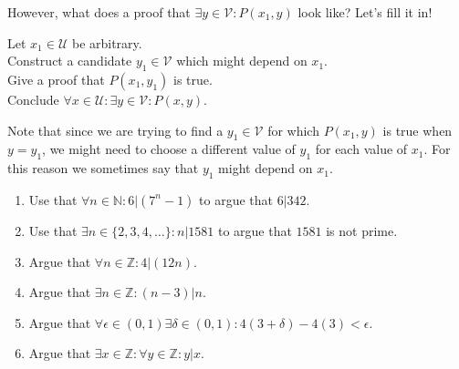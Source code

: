 However, what does a proof that $\exists y \in \mathcal{V}: P(x_1,y)$ look like?  Let's fill it in!

\begin{fitch*}
	\textrm{Let $x_1 \in \mathcal{U}$ be arbitrary.}\\
	\textrm{Construct a candidate $y_1 \in \mathcal{V}$ which might depend on $x_1$. }\\
	\textrm{Give a proof that $P(x_1,y_1)$ is true.}\\
	\textrm{Conclude $\forall x \in \mathcal{U}: \exists y \in \mathcal{V}: P(x,y)$.}
\end{fitch*} 

Note that since we are trying to find a $y_1 \in \mathcal{V}$ for which $P(x_1,y)$ is true when $y = y_1$, we might need to choose a different value of $y_1$ for each value of $x_1$.  For this reason we sometimes say that $y_1$ might depend on $x_1$. 



\begin{xca}	
	\begin{enumerate}
		\item Use that $\forall n \in \mathbb{N}: 6 | (7^n-1)$ to argue that $6 | 342$.
		\item Use that $\exists n  \in \{2,3,4, \dots \}: n |  1581$ to argue that $1581$ is not prime.
		\item Argue that $\forall n \in \mathbb{Z}:  4 | (12n)$.
		\item Argue that $\exists n \in \mathbb{Z}: (n-3)|n$.
		\item Argue that $\forall \epsilon \in (0,1) \exists \delta \in (0,1): 4(3+\delta)-4(3) < \epsilon$.
		\item Argue that $\exists x \in \mathbb{Z}: \forall y \in \mathbb{Z}:  y|x$.
		\end{enumerate}
	\end{xca}

